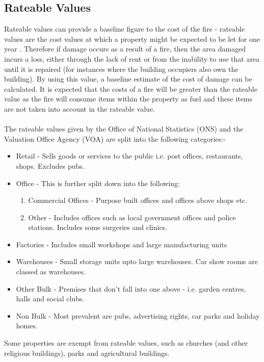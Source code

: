 \documentclass[a4paper,oneside]{book}
\begin{document}
\subsection{Rateable Values}
Rateable values can provide a baseline figure to the cost of the fire - rateable values are the cost values at which a property might be expected to be let for one year \citep{ValuationOfficeAgency2008}. Therefore if damage occurs as a result of a fire, then the area damaged incurs a loss, either through the lack of rent or from the inability to use that area until it is repaired (for instances where the building occupiers also own the building). By using this value, a baseline estimate of the cost of damage can be calculated. It is expected that the costs of a fire will be greater than the rateable value as the fire will consume items within the property as fuel and these items are not taken into account in the rateable value.
\\
\\
The rateable values given by the Office of National Statistics (ONS) and the Valuation Office Agency (VOA) are split into the following categories:-
\begin{itemize}
\item Retail - Sells goods or services to the public i.e. post offices, restaurants, shops. Excludes pubs.
\item Office - This is further split down into the following:
\begin{enumerate}
\item Commercial Offices - Purpose built offices and offices above shops etc.
\item Other - Includes offices such as local government offices and police stations. Includes some surgeries and clinics.
\end{enumerate}
\item Factories - Includes small workshops and large manufacturing units
\item Warehouses - Small storage units upto large warehouses. Car show rooms are classed as warehouses.
\item Other Bulk - Premises that don't fall into one above - i.e. garden centres, halls and social clubs.
\item Non Bulk - Most prevalent are pubs, advertising rights, car parks and holiday homes.
\end{itemize}
Some properties are exempt from rateable values, such as churches (and other religious buildings), parks and agricultural buildings.
\\
\\


\clearpage
{}


\end{document}
